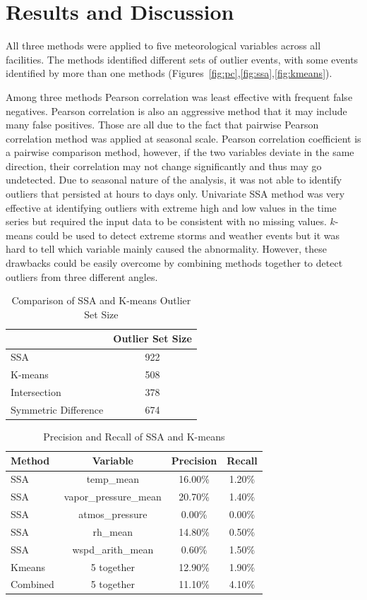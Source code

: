 \section{Results and Discussion}
All three methods were applied to five meteorological variables across
all facilities. The methods identified different sets of outlier events,
with some events identified by more than one methods
(Figures~\ref{fig:pc},\ref{fig:ssa},\ref{fig:kmeans}).

Among three methods Pearson correlation was least effective with
frequent false negatives. Pearson correlation is also an aggressive method that
it may include many false positives. Those are all due to the fact 
that pairwise Pearson correlation method was applied at seasonal scale.
Pearson correlation coefficient is a pairwise comparison method, however, 
if the two variables deviate in the same direction, their correlation 
may not change significantly and thus may go undetected. Due to seasonal
nature of the analysis, it was not able to identify outliers that
persisted at hours to days only. Univariate SSA method was very effective 
at identifying outliers with extreme high and low values in the time series 
but required the input data to be consistent with no missing values.
$k$-means could be used to detect extreme storms and weather events but it was hard
to tell which variable mainly caused the abnormality. However, these drawbacks 
could be easily overcome by combining methods together to detect 
outliers from three different angles.

\begin{table}[ht]
\caption{Comparison of SSA and K-means Outlier Set Size}
\label{tab:comp}
\centering
\begin{tabular}{|l|c|}
\cline{2-2}
\multicolumn{1}{l|}{} & Outlier Set Size\\
\hline
SSA & 922\\
K-means & 508\\
Intersection & 378\\
Symmetric Difference & 674\\
\hline
\end{tabular}
\end{table}

\begin{table}[ht]
\caption{Precision and Recall of SSA and K-means}
\label{tab:pr}
\centering
\begin{tabular}{|l|c|c|c|}
\hline
Method & Variable & Precision & Recall\\
\hline
SSA & temp\_mean & 16.00\% & 1.20\%\\
SSA & vapor\_pressure\_mean & 20.70\% & 1.40\%\\
SSA & atmos\_pressure & 0.00\% & 0.00\%\\
SSA & rh\_mean & 14.80\% & 0.50\%\\
SSA & wspd\_arith\_mean & 0.60\% & 1.50\%\\
Kmeans & 5 together & 12.90\% & 1.90\%\\
Combined & 5 together & 11.10\% & 4.10\%\\
\hline
\end{tabular}
\end{table}

